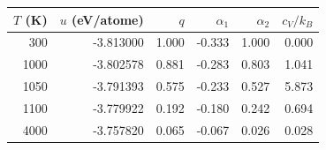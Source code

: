 \begin{center}\small
\begin{tabular}{rrrrrr}\toprule
$T$ (K) & $u$ (eV/atome) & $q$ & $\alpha_1$ & $\alpha_2$ & $c_V/k_B$\\\midrule
300 & -3.813000 & 1.000 & -0.333 & 1.000 & 0.000\\
1000 & -3.802578 & 0.881 & -0.283 & 0.803 & 1.041\\
1050 & -3.791393 & 0.575 & -0.233 & 0.527 & 5.873\\
1100 & -3.779922 & 0.192 & -0.180 & 0.242 & 0.694\\
4000 & -3.757820 & 0.065 & -0.067 & 0.026 & 0.028\\
\bottomrule\end{tabular}\end{center}
